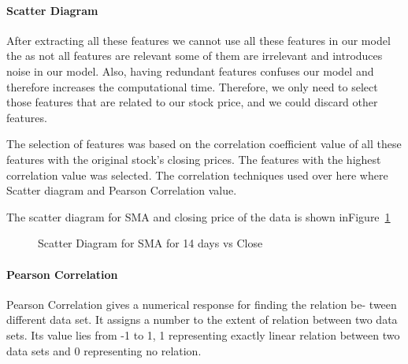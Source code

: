 \documentclass[5p,,preprint,12pt,twocolumn]{elsarticle}
\makeatletter
\def\fixFloatSize#1{}%
\makeatother
\begin{document}
\paragraph{Scatter Diagram}After extracting all these features we cannot use all these features in our model the as not all features are relevant some of them are irrelevant and introduces noise in our model. Also, having redundant features confuses our model and therefore increases the computational time. Therefore, we only need to select those features that are related to our stock price, and we could discard other features.

The selection of features was based on the correlation coefficient value of all these features with the original stock's closing prices. The features with the highest correlation value was selected. The correlation techniques used over here where Scatter diagram and Pearson Correlation value.

The scatter diagram for SMA and closing price of the data is shown inFigure~\ref{f-3c29855fadb4}


\bgroup
\fixFloatSize{images/3e4c774f-006a-4ee9-ba85-51801c340351-uscatter-diagram-ma14-days.png}
\begin{figure}[!htbp]
\centering \makeatletter{}
\makeatother 
\caption{{Scatter Diagram for SMA for 14 days vs Close}}
\label{f-3c29855fadb4}
\end{figure}
\egroup




\paragraph{Pearson Correlation}Pearson Correlation gives a numerical response for finding the relation be- tween different data set. It assigns a number to the extent of relation between two data sets. Its value lies from -1 to 1, 1 representing exactly linear relation between two data sets and 0 representing no relation.
\end{document}

